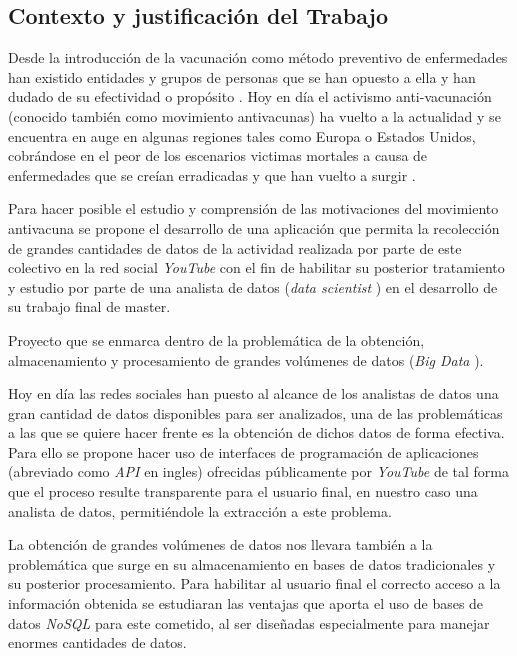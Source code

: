 \documentclass[11pt,a4paper]{article}
\begin{document}
\subsection{Contexto y justificación del Trabajo}
Desde la introducción de la vacunación como método preventivo de enfermedades han existido entidades y grupos de personas que se han opuesto a ella y han dudado de su efectividad o propósito \cite{1}. Hoy en día el activismo anti-vacunación (conocido también como movimiento antivacunas) ha vuelto a la actualidad y se encuentra en auge en algunas regiones tales como Europa o Estados Unidos, cobrándose en el peor de los escenarios victimas mortales a causa de enfermedades que se creían erradicadas y que han vuelto a surgir \cite{2}\cite{3}. 

Para hacer posible el estudio y comprensión de las motivaciones del movimiento antivacuna se propone el desarrollo de una aplicación que permita la recolección de grandes cantidades de datos de la actividad realizada por parte de este colectivo en la red social \textit{YouTube} con el fin de habilitar su posterior tratamiento y estudio por parte de una analista de datos (\textit{data scientist} \cite{4}) en el desarrollo de su trabajo final de master. 
\linebreak

Proyecto que se enmarca dentro de la problemática de la obtención, almacenamiento y procesamiento de grandes volúmenes de datos (\textit{Big Data} \cite{5}).
\linebreak

Hoy en día las redes sociales han puesto al alcance de los analistas de datos una gran cantidad de datos disponibles para ser analizados, una de las problemáticas a las que se quiere hacer frente es la obtención de dichos datos de forma efectiva. Para ello se propone hacer uso de interfaces de programación de aplicaciones (abreviado como \textit{API} \cite{6} en ingles) ofrecidas públicamente por \textit{YouTube} de tal forma que el proceso resulte transparente para el usuario final, en nuestro caso una analista de datos, permitiéndole la extracción a este problema. 

La obtención de grandes volúmenes de datos nos llevara también a la problemática que surge en su almacenamiento en bases de datos tradicionales y su posterior procesamiento. Para habilitar al usuario final el correcto acceso a la información obtenida se estudiaran las ventajas que aporta el uso de bases de datos \textit{NoSQL} \cite{7} para este cometido, al ser diseñadas especialmente para manejar enormes cantidades de datos.
\end{document}

